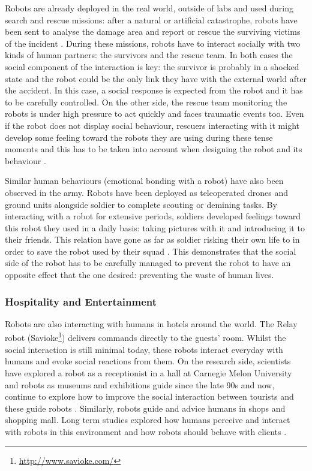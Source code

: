     Robots are already deployed in the real world, outside of labs and used during search and rescue missions: after a natural or artificial catastrophe, robots have been sent to analyse the damage area and report or rescue the surviving victims of the incident \citep{murphy2008search}. During these missions, robots have to interact socially with two kinds of human partners: the survivors and the rescue team. In both cases the social component of the interaction is key: the survivor is probably in a shocked state and the robot could be the only link they have with the external world after the accident. In this case, a social response is expected from the robot and it has to be carefully controlled. On the other side, the rescue team monitoring the robots is under high pressure to act quickly and faces traumatic events too. Even if the robot does not display social behaviour, rescuers interacting with it might develop some feeling toward the robots they are using during these tense moments and this has to be taken into account when designing the robot and its behaviour \citep{fincannon2004evidence}.
	
    Similar human behaviours (emotional bonding with a robot) have also been observed in the army. Robots have been deployed as teleoperated drones and ground units alongside soldier to complete scouting or demining tasks. By interacting with a robot for extensive periods, soldiers developed feelings toward this robot they used in a daily basis: taking pictures with it and introducing it to their friends. This relation have gone as far as soldier risking their own life to in order to save the robot used by their squad \citep{singer2009wired}. This demonstrates that the social side of the robot has to be carefully managed to prevent the robot to have an opposite effect that the one desired: preventing the waste of human lives.
		
\subsubsection{Hospitality and Entertainment} 
	
	Robots are also interacting with humans in hotels around the world. The Relay robot (Savioke\footnote{\url{http://www.savioke.com/}}) delivers commands directly to the guests' room. Whilst the social interaction is still minimal today, these robots interact everyday with humans and evoke social reactions from them. On the research side, scientists have explored a robot as a receptionist in a hall at Carnegie Melon University \citep{gockley2005designing} and robots as museums and exhibitions guide since the late 90s \citep{thrun1999minerva,burgard1999experiences} and now, continue to explore how to improve the social interaction between tourists and these guide robots \citep{bennewitz2005towards}. Similarly, robots guide and advice humans in shops and shopping mall. Long term studies explored how humans perceive and interact with robots in this environment \citep{kanda2009affective} and how robots should behave with clients \citep{kanda2008will}.


